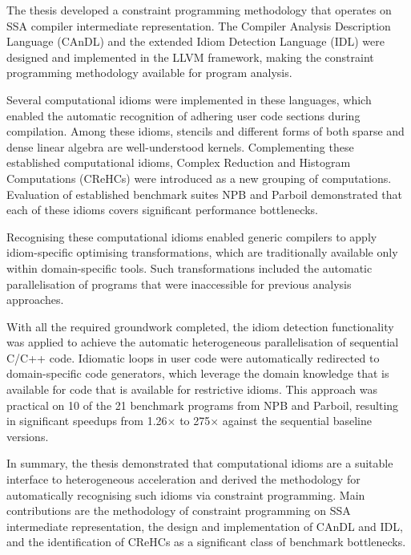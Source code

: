 
    The thesis developed a constraint programming methodology that operates on
    SSA compiler intermediate representation.
    The Compiler Analysis Description Language (CAnDL) and the extended Idiom
    Detection Language (IDL) were designed and implemented in the LLVM
    framework, making the constraint programming methodology available for
    program analysis.

    Several computational idioms were implemented in these languages, which
    enabled the automatic recognition of adhering user code sections during
    compilation.
    Among these idioms, stencils and different forms of both sparse and
    dense linear algebra are well-understood kernels.
    Complementing these established computational idioms, Complex Reduction and
    Histogram Computations (CReHCs) were introduced as a new grouping of
    computations.
    Evaluation of established benchmark suites NPB and Parboil demonstrated that
    each of these idioms covers significant performance bottlenecks.

    Recognising these computational idioms enabled generic compilers to apply
    idiom-specific optimising transformations, which are traditionally available
    only within domain-specific tools.
    Such transformations included the automatic parallelisation of programs that
    were inaccessible for previous analysis approaches.

    With all the required groundwork completed, the idiom detection
    functionality was applied to achieve the automatic heterogeneous
    parallelisation of sequential C/C++ code.
    Idiomatic loops in user code were automatically redirected to
    domain-specific code generators, which leverage the domain knowledge that
    is available for code that is available for restrictive idioms.
    This approach was practical on 10 of the 21 benchmark programs from NPB and
    Parboil, resulting in significant speedups from 1.26$\times$  to 275$\times$
    against the sequential baseline versions.

    In summary, the thesis demonstrated that computational idioms are a
    suitable interface to heterogeneous acceleration and derived the
    methodology for automatically recognising such idioms via constraint
    programming.
    Main contributions are the methodology of constraint programming on SSA
    intermediate representation, the design and implementation of CAnDL and IDL,
    and the identification of CReHCs as a significant class of benchmark
    bottlenecks.

